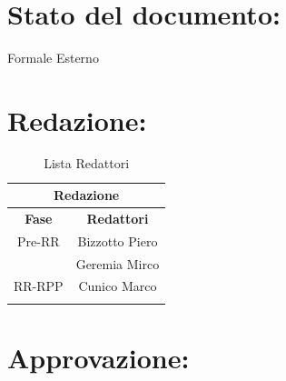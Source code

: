 \newpage

\begin{center} %
	\begin{Huge}	
				\textbf{\TITOLODOC}
			\\
	\end{Huge}
\end{center}


\section*{\LARGE Stato del documento:}
\indent \indent
	Formale Esterno

\section*{\LARGE Redazione:}
	\begin{table}[!h]
		\begin{center}
			\begin{tabular}
				{|c|c|}
				\hline
				\multicolumn{2}{|c|}{ \textbf{Redazione} } \\
				\hline
				\textbf{Fase} & \textbf{Redattori} \\
				\hline
				{Pre-RR} &  Bizzotto Piero \\ & Geremia Mirco \\
				\hline
				{RR-RPP} &  Cunico Marco \\ & \\
				\hline
			\end{tabular}
			\caption{Lista Redattori} %
			\label{tabredazione}
		\end{center}
	\end{table}
	
\section*{\LARGE Approvazione:}

